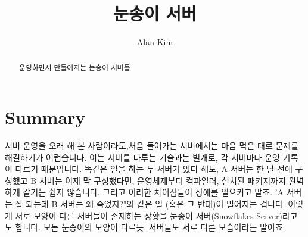 \documentclass[a4paper, 10pt]{article}
\title{눈송이 서버}
\author{Alan Kim}
\begin{document}
\maketitle
\begin{abstract}
운영하면서 만들어지는 눈송이 서버들
\end{abstract}

\section{Summary}

서버 운영을 오래 해 본 사람이라도,처음 들어가는 서버에서는 마음 먹은 대로 문제를 해결하기가 어렵습니다. 이는 서버를 다루는 기술과는 별개로, 각 서버마다 운영 기록이 다르기 때문입니다. 똑같은 일을 하는 두 서버가 있다 해도, A 서버는 한 달 전에 구성했고 B 서버는 이제 막 구성했다면, 운영체제부터 컴파일러, 설치된 패키지까지 완벽하게 같기는 쉽지 않습니다. 그리고 이러한 차이점들이 장애를 일으키고 말죠. 'A 서버는 잘 되는데 B 서버는 왜 죽었지?"와 같은 일 (혹은 그 반대)이 벌어지는 겁니다.
이렇게 서로 모양이 다른 서버들이 존재하는 상황을 눈송이 서버(Snowflakes Server)라고도 합니다. 모든 눈송이의 모양이 다르듯, 서버들도 서로 다른 모습이라는 말이죠.

\end{document}
